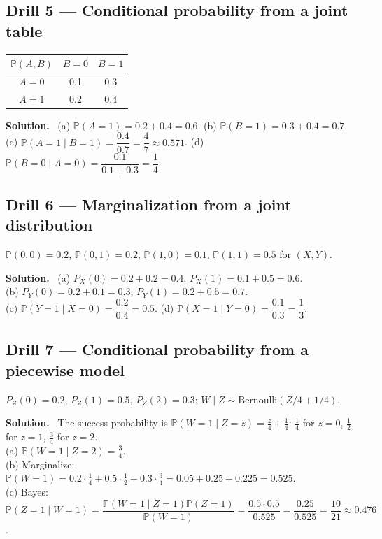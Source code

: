 \documentclass[11pt]{article}
\renewcommand{\P}{\mathbb{P}}
\newcommand{\Bern}{\text{Bernoulli}}
\newenvironment{soln}{\par\smallskip\noindent\textbf{Solution.}\ }{\par\medskip}
\begin{document}
\subsection*{Drill 5 --- Conditional probability from a joint table}
\begin{center}
\begin{tabular}{c|cc}
$\P(A,B)$ & $B=0$ & $B=1$\\\hline
$A=0$ & 0.1 & 0.3\\
$A=1$ & 0.2 & 0.4
\end{tabular}
\end{center}
\begin{soln}
(a) $\P(A{=}1)=0.2+0.4=0.6$. \quad (b) $\P(B{=}1)=0.3+0.4=0.7$.\\
(c) $\P(A{=}1\mid B{=}1)=\dfrac{0.4}{0.7}=\dfrac47\approx0.571$. \quad (d) $\P(B{=}0\mid A{=}0)=\dfrac{0.1}{0.1+0.3}=\dfrac14$.
\end{soln}

\subsection*{Drill 6 --- Marginalization from a joint distribution}
$\P(0,0)=0.2$, $\P(0,1)=0.2$, $\P(1,0)=0.1$, $\P(1,1)=0.5$ for $(X,Y)$.
\begin{soln}
(a) $P_X(0)=0.2+0.2=0.4$, $P_X(1)=0.1+0.5=0.6$.\\
(b) $P_Y(0)=0.2+0.1=0.3$, $P_Y(1)=0.2+0.5=0.7$.\\
(c) $\P(Y{=}1\mid X{=}0)=\dfrac{0.2}{0.4}=0.5$. \quad (d) $\P(X{=}1\mid Y{=}0)=\dfrac{0.1}{0.3}=\dfrac13$.
\end{soln}

\subsection*{Drill 7 --- Conditional probability from a piecewise model}
$P_Z(0)=0.2$, $P_Z(1)=0.5$, $P_Z(2)=0.3$; $W\mid Z\sim\Bern(Z/4+1/4)$.
\begin{soln}
The success probability is $\P(W{=}1\mid Z{=}z)=\frac z4+\frac14$: $\frac14$ for $z=0$, $\frac12$ for $z=1$, $\frac34$ for $z=2$.\\
(a) $\P(W{=}1\mid Z{=}2)=\frac34$.\\
(b) Marginalize: $\P(W{=}1)=0.2\cdot\frac14+0.5\cdot\frac12+0.3\cdot\frac34=0.05+0.25+0.225=0.525$.\\
(c) Bayes: $\P(Z{=}1\mid W{=}1)=\dfrac{\P(W{=}1\mid Z{=}1)\P(Z{=}1)}{\P(W{=}1)}=\dfrac{0.5\cdot0.5}{0.525}=\dfrac{0.25}{0.525}=\dfrac{10}{21}\approx0.476$.
\end{soln}
\end{document}
